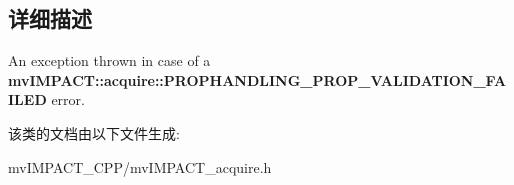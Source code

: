 \subsection{详细描述}
An exception thrown in case of a {\bfseries mv\+I\+M\+P\+A\+C\+T\+::acquire\+::\+P\+R\+O\+P\+H\+A\+N\+D\+L\+I\+N\+G\+\_\+\+P\+R\+O\+P\+\_\+\+V\+A\+L\+I\+D\+A\+T\+I\+O\+N\+\_\+\+F\+A\+I\+L\+E\+D} error. 

该类的文档由以下文件生成\+:\begin{DoxyCompactItemize}
\item 
mv\+I\+M\+P\+A\+C\+T\+\_\+\+C\+P\+P/mv\+I\+M\+P\+A\+C\+T\+\_\+acquire.\+h\end{DoxyCompactItemize}
